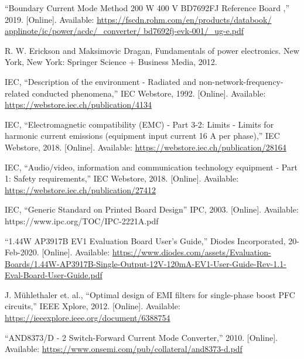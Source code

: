 \documentclass[12pt]{article}
\begin{document}
\begin{thebibliography}{9}
    “Boundary Current Mode Method 200 W 400 V BD7692FJ Reference Board ,” 2019. [Online]. Available: \href{https://fscdn.rohm.com/en/products/databook/applinote/ic/power/acdc/_converter/bd7692fj-evk-001/_ug-e.pdf}{https://fscdn.rohm.com/en/products/databook/ applinote/ic/power/acdc/\_converter/ bd7692fj-evk-001/\_ug-e.pdf}

    R. W. Erickson and Maksimovic Dragan, Fundamentals of power electronics. New York, New York: Springer Science + Business Media, 2012.

    IEC, “Description of the environment - Radiated and non-network-frequency-related conducted phenomena,” IEC Webstore, 1992. [Online]. Available: 
    \href{https://webstore.iec.ch/publication/4134}{https://webstore.iec.ch/publication/4134}

    IEC, “Electromagnetic compatibility (EMC) - Part 3-2: Limits - Limits for harmonic current emissions (equipment input current 16 A per phase),” IEC Webstore, 2018. [Online]. Available:
    \href{https://webstore.iec.ch/publication/28164}{https://webstore.iec.ch/publication/28164}

    IEC, “Audio/video, information and communication technology equipment - Part 1: Safety requirements,” IEC Webstore, 2018. [Online]. Available: 
    \href{https://webstore.iec.ch/publication/27412}{https://webstore.iec.ch/publication/27412}

    IEC, “Generic Standard on Printed Board Design” IPC, 2003. [Online]. Available: https://www.ipc.org/TOC/IPC-2221A.pdf

    “1.44W AP3917B EV1 Evaluation Board User’s Guide,” Diodes Incorporated, 20-Feb-2020. [Online]. Available: \href{https://www.diodes.com/assets/Evaluation-Boards/1.44W-AP3917B-Single-Output-12V-120mA-EV1-User-Guide-Rev-1.1-Eval-Board-User-Guide.pdf}{https://www.diodes.com/assets/Evaluation-Boards/1.44W-AP3917B-Single-Output-12V-120mA-EV1-User-Guide-Rev-1.1-Eval-Board-User-Guide.pdf}

    J. Mühlethaler et. al., “Optimal design of EMI filters for single-phase boost PFC circuits,” IEEE Xplore, 2012. [Online]. Available: 
    \href{https://ieeexplore.ieee.org/document/6388754}{https://ieeexplore.ieee.org/document/6388754}

    “AND8373/D - 2 Switch-Forward Current Mode Converter,” 2010. [Online]. Available: \href{https://www.onsemi.com/pub/collateral/and8373-d.pdf}{https://www.onsemi.com/pub/collateral/and8373-d.pdf}


\end{thebibliography}
\end{document}
